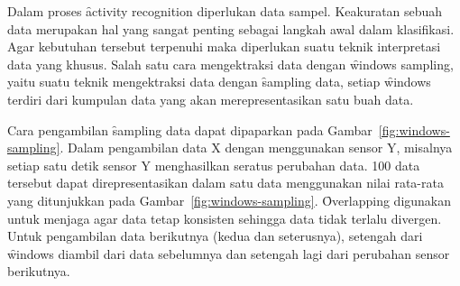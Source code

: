 Dalam proses \f{activity recognition} diperlukan data sampel. Keakuratan sebuah data
merupakan hal yang sangat penting sebagai langkah awal dalam klasifikasi. Agar
kebutuhan tersebut terpenuhi maka diperlukan suatu teknik interpretasi data
yang khusus. Salah satu cara mengektraksi data dengan \f{windows sampling},
yaitu suatu teknik mengektraksi data dengan \f{sampling} data, setiap
\f{windows} terdiri dari kumpulan data yang akan merepresentasikan satu buah
data.

Cara pengambilan \f{sampling} data dapat dipaparkan pada
Gambar~\ref{fig:windows-sampling}. Dalam
pengambilan data X dengan menggunakan sensor Y, misalnya setiap satu detik
sensor Y menghasilkan seratus perubahan data. 100 data tersebut dapat
direpresentasikan dalam satu data menggunakan nilai rata-rata yang ditunjukkan
pada Gambar~\ref{fig:windows-sampling}. \f{Overlapping} digunakan untuk menjaga
agar data tetap konsisten sehingga data tidak terlalu divergen. Untuk
pengambilan data berikutnya (kedua dan seterusnya), setengah dari \f{windows}
diambil dari data sebelumnya dan setengah lagi dari perubahan sensor berikutnya.

        




